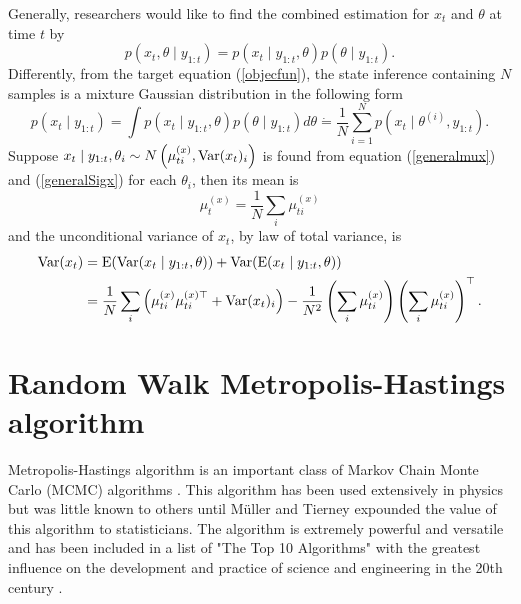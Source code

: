 Generally, researchers would like to find the combined estimation for $x_t$ and $\theta$ at time $t$ by
\begin{equation*}
p(x_t, \theta \mid y_{1:t}) = p(x_t\mid y_{1:t},\theta)p(\theta\mid y_{1:t}).
\end{equation*}
Differently, from the target equation (\ref{objecfun}), the state inference containing $N$ samples is a mixture Gaussian distribution in the following form 
\begin{equation}\label{mixtureGaussian}
p(x_t \mid y_{1:t}) = \int p(x_t\mid y_{1:t},\theta) p(\theta\mid y_{1:t})d\theta \dot{=} \frac{1}{N}\sum_{i=1}^{N}p(x_{t}\mid\theta^{(i)},y_{1:t}). 
\end{equation}
Suppose $x_t\mid y_{1:t},\theta_i \sim N\left( \mu_{ti}^{(x)},\mathrm{Var}(x_t)_i \right)$ is found from equation (\ref{generalmux}) and (\ref{generalSigx}) for each $\theta_i$, then its mean is 
\begin{equation}\label{mixturemean}
\mu_t^{(x)} = \frac{1}{N} \sum_i \mu_{ti}^{(x)} 
\end{equation}
and  the unconditional variance of $x_t$, by law of total variance, is 
\begin{equation}\label{mixturevariance}
\begin{split}
\mathrm{Var}(x_t) &= \mathrm{E}(\mathrm{Var}(x_t\mid y_{1:t},\theta)) + \mathrm{Var}(\mathrm{E}(x_t\mid y_{1:t},\theta))   \\
&= \frac{1}{N} \sum_i \left( \mu_{ti}^{(x)}  \mu_{ti}^{(x)\top} +\mathrm{Var}(x_t)_i\right) -\frac{1}{N^2} \left(  \sum_i  \mu_{ti}^{(x)} \right) \left( \sum_i \mu_{ti}^{(x)} \right) ^\top.
\end{split}
\end{equation}

\section{Random Walk Metropolis-Hastings algorithm}

Metropolis-Hastings algorithm is an important class of Markov Chain Monte Carlo (MCMC) algorithms \cite{smith1993bayesian} \cite{tierney1994markov} \cite{gilks1995markov}.  This algorithm has been used extensively in physics but was little known to others until M\"{u}ller \cite{muller1991generic} and Tierney \cite{tierney1994markov} expounded the value of this algorithm to statisticians. The algorithm is extremely powerful and versatile and has been included in a list of "The Top 10 Algorithms"  with the greatest influence on the development and practice of science and engineering in the 20th century \cite{dongarra2000guest} \cite{medova2008bayesian}. 

